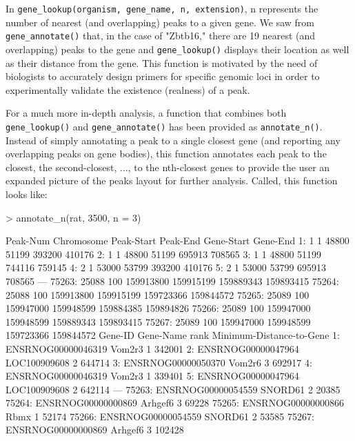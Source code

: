 \documentclass[12pt]{article}
\begin{document}
In \texttt{gene\_lookup(organism, gene\_name, n, extension)}, n represents the number of nearest (and overlapping) peaks to a given gene. We saw from \texttt{gene\_annotate()} that, in the case of "Zbtb16," there are 19 nearest (and overlapping) peaks to the gene and \texttt{gene\_lookup()} displays their location as well as their distance from the gene. This function is motivated by the need of biologists to accurately design primers for specific genomic loci in order to experimentally validate the existence (realness) of a peak.

For a much more in-depth analysis, a function that combines both \texttt{gene\_lookup()} and \texttt{gene\_annotate()} has been provided as \texttt{annotate\_n()}. Instead of simply annotating a peak to a single closest gene (and reporting any overlapping peaks on gene bodies), this function annotates each peak to the closest, the second-closest, ..., to the nth-closest genes to provide the user an expanded picture of the peaks layout for further analysis. Called, this function looks like:

\begin{Schunk}
\begin{Sinput}
> annotate_n(rat, 3500, n = 3)
\end{Sinput}
\begin{Soutput}
       Peak-Num Chromosome Peak-Start  Peak-End Gene-Start  Gene-End
    1:        1          1      48800     51199     393200    410176
    2:        1          1      48800     51199     695913    708565
    3:        1          1      48800     51199     744116    759145
    4:        2          1      53000     53799     393200    410176
    5:        2          1      53000     53799     695913    708565
   ---                                                              
75263:    25088        100  159913800 159915199  159889343 159893415
75264:    25088        100  159913800 159915199  159723366 159844572
75265:    25089        100  159947000 159948599  159884385 159894826
75266:    25089        100  159947000 159948599  159889343 159893415
75267:    25089        100  159947000 159948599  159723366 159844572
                  Gene-ID    Gene-Name rank Minimum-Distance-to-Gene
    1: ENSRNOG00000046319       Vom2r3    1                   342001
    2: ENSRNOG00000047964 LOC100909608    2                   644714
    3: ENSRNOG00000050370       Vom2r6    3                   692917
    4: ENSRNOG00000046319       Vom2r3    1                   339401
    5: ENSRNOG00000047964 LOC100909608    2                   642114
   ---                                                              
75263: ENSRNOG00000054559      SNORD61    2                    20385
75264: ENSRNOG00000000869      Arhgef6    3                    69228
75265: ENSRNOG00000000866         Rbmx    1                    52174
75266: ENSRNOG00000054559      SNORD61    2                    53585
75267: ENSRNOG00000000869      Arhgef6    3                   102428
\end{Soutput}
\end{Schunk}
\end{document}

